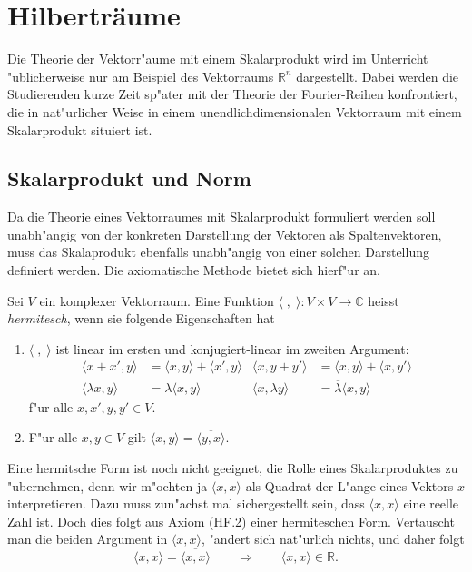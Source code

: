 %
%
%
\chapter{Hilberträume
\label{chapter:hilbertspaces}}
Die Theorie der Vektorr"aume mit einem Skalarprodukt wird im Unterricht
"ublicherweise nur am Beispiel des Vektorraums $\mathbb R^n$ dargestellt.
Dabei werden die Studierenden kurze Zeit sp"ater mit der Theorie
der Fourier-Reihen konfrontiert, die in nat"urlicher Weise in einem
unendlichdimensionalen Vektorraum mit einem Skalarprodukt situiert ist.

\section{Skalarprodukt und Norm}
Da die Theorie eines Vektorraumes mit Skalarprodukt formuliert werden
soll unabh"angig von der konkreten Darstellung der Vektoren als 
Spaltenvektoren, muss das Skalaprodukt ebenfalls unabh"angig von einer
solchen Darstellung definiert werden.
Die axiomatische Methode bietet sich hierf"ur an.

\begin{definition}
\label{hilbert:hermitescheform}
Sei $V$ ein komplexer Vektorraum.
Eine Funktion $\langle\;,\;\rangle\colon V\times V\to\mathbb C$ heisst
{\em hermitesch}, wenn sie folgende Eigenschaften hat
\begin{enumerate}[label={\bf HF.\arabic*},itemsep=0mm]
\item $\langle\;,\;\rangle$ ist linear im ersten und konjugiert-linear
im zweiten Argument:
\begin{align*}
\langle x+x',y\rangle &=\langle x,y\rangle + \langle x',y\rangle
&
\langle x,y+y'\rangle &=\langle x,y\rangle + \langle x,y'\rangle
\\
\langle\lambda x,y\rangle&=\lambda\langle x,y\rangle
&
\langle x,\lambda y\rangle&=\overline\lambda\langle x,y\rangle
\end{align*}
f"ur alle $x,x',y,y'\in V$.
\item F"ur alle $x,y\in V$ gilt
$\langle x,y\rangle=\overline{\langle y,x\rangle}$.
\end{enumerate}
\end{definition}
Eine hermitsche Form ist noch nicht geeignet, die Rolle eines
Skalarproduktes zu "ubernehmen, denn wir m"ochten ja $\langle x,x\rangle$
als Quadrat der L"ange eines Vektors $x$ interpretieren.
Dazu muss zun"achst mal sichergestellt sein, dass $\langle x,x\rangle$
eine reelle Zahl ist.
Doch dies folgt aus Axiom (HF.2) einer hermiteschen Form.
Vertauscht man die beiden Argument in $\langle x,x\rangle$, "andert
sich nat"urlich nichts, und daher folgt
\[
\langle x,x\rangle = \overline{\langle x,x\rangle}
\qquad\Rightarrow\qquad
\langle x,x\rangle\in\mathbb R.
\]

